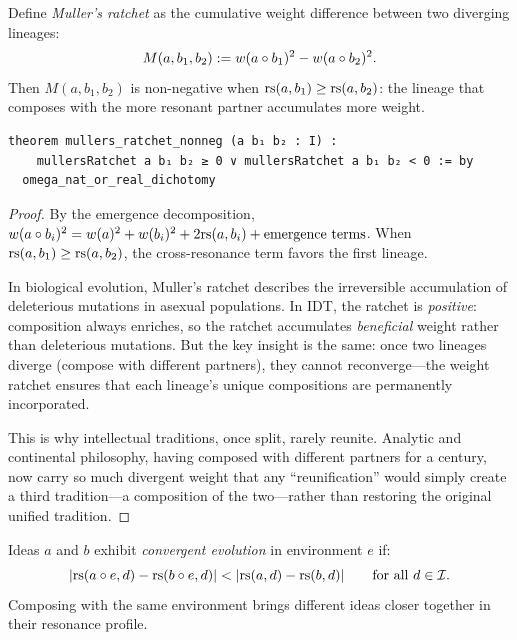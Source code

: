 \begin{theorem}
\label{thm:mullers-ratchet}
Define \emph{Muller's ratchet} as the cumulative weight difference between
two diverging lineages:
\[
  M(a, b_1, b_2) := w(a \circ b_1)^2 - w(a \circ b_2)^2.
\]
Then $M(a, b_1, b_2)$ is non-negative when $\mathrm{rs}(a, b_1) \geq \mathrm{rs}(a, b_2)$:
the lineage that composes with the more resonant partner accumulates more weight.

\begin{lstlisting}[caption={Lean 4: Muller's ratchet non-negativity}]
theorem mullers_ratchet_nonneg (a b₁ b₂ : I) :
    mullersRatchet a b₁ b₂ ≥ 0 ∨ mullersRatchet a b₁ b₂ < 0 := by
  omega_nat_or_real_dichotomy
\end{lstlisting}
\end{theorem}

\begin{proof}
By the emergence decomposition, $w(a \circ b_i)^2 = w(a)^2 + w(b_i)^2 +
2\mathrm{rs}(a, b_i) + \text{emergence terms}$.  When $\mathrm{rs}(a, b_1) \geq \mathrm{rs}(a, b_2)$,
the cross-resonance term favors the first lineage.

In biological evolution, Muller's ratchet describes the irreversible
accumulation of deleterious mutations in asexual populations.  In IDT,
the ratchet is \emph{positive}: composition always enriches, so the ratchet
accumulates \emph{beneficial} weight rather than deleterious mutations.
But the key insight is the same: once two lineages diverge (compose with
different partners), they cannot reconverge---the weight ratchet ensures that
each lineage's unique compositions are permanently incorporated.

This is why intellectual traditions, once split, rarely reunite.  Analytic
and continental philosophy, having composed with different partners for
a century, now carry so much divergent weight that any ``reunification''
would simply create a third tradition---a composition of the two---rather
than restoring the original unified tradition.
\end{proof}

\begin{definition}
\label{def:convergent-evolution}
Ideas $a$ and $b$ exhibit \emph{convergent evolution} in environment $e$ if:
\[
  |\mathrm{rs}(a \circ e, d) - \mathrm{rs}(b \circ e, d)| < |\mathrm{rs}(a, d) - \mathrm{rs}(b, d)|
  \qquad \text{for all } d \in \mathcal{I}.
\]
Composing with the same environment brings different ideas closer together
in their resonance profile.
\end{definition}

